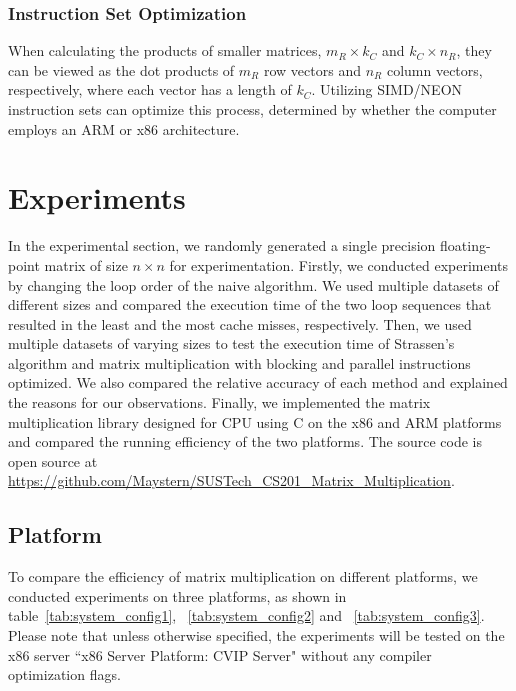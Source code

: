 \documentclass[conference]{IEEEtran}
\begin{document}
	\subsubsection{Instruction Set Optimization}
	When calculating the products of smaller matrices, $m_R \times k_C$ and $k_C \times n_R$, they can be viewed as the dot products of $m_R$ row vectors and $n_R$ column vectors, respectively, where each vector has a length of $k_C$. Utilizing SIMD/NEON instruction sets can optimize this process, determined by whether the computer employs an ARM or x86 architecture.
	
	
	\section{Experiments}
	
	In the experimental section, we randomly generated a single precision floating-point matrix of size $n \times n$ for experimentation. Firstly, we conducted experiments by changing the loop order of the naive algorithm. We used multiple datasets of different sizes and compared the execution time of the two loop sequences that resulted in the least and the most cache misses, respectively. Then, we used multiple datasets of varying sizes to test the execution time of Strassen's algorithm and matrix multiplication with blocking and parallel instructions optimized. We also compared the relative accuracy of each method and explained the reasons for our observations. Finally, we implemented the matrix multiplication library designed for CPU using C on the x86 and ARM platforms and compared the running efficiency of the two platforms. The source code is open source at \url{https://github.com/Maystern/SUSTech_CS201_Matrix_Multiplication}.
	
	\subsection{Platform}
	To compare the efficiency of matrix multiplication on different platforms, we conducted experiments on three platforms, as shown in table~\ref{tab:system_config1}, ~\ref{tab:system_config2} and ~\ref{tab:system_config3}. Please note that unless otherwise specified, the experiments will be tested on the x86 server ``x86 Server Platform: CVIP Server" without any compiler optimization flags.
	
\end{document}
